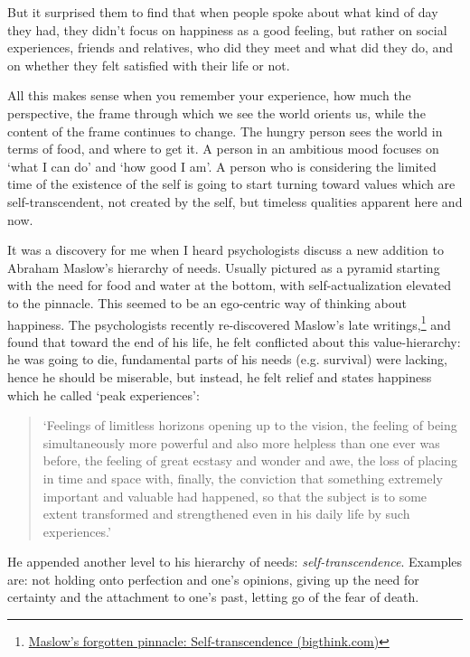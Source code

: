 
But it surprised them to find that when people spoke about what kind of
day they had, they didn't focus on happiness as a good feeling, but
rather on social experiences, friends and relatives, who did they meet
and what did they do, and on whether they felt satisfied with their life
or not.

All this makes sense when you remember your experience, how much the
perspective, the frame through which we see the world orients us, while
the content of the frame continues to change. The hungry person sees the
world in terms of food, and where to get it. A person in an ambitious
mood focuses on `what I can do' and `how good I am'. A person who is
considering the limited time of the existence of the self is going to
start turning toward values which are self-transcendent, not created by
the self, but timeless qualities apparent here and now.

It was a discovery for me when I heard psychologists discuss a new
addition to Abraham Maslow's hierarchy of needs. Usually pictured as a
pyramid starting with the need for food and water at the bottom, with
self-actualization elevated to the pinnacle. This seemed to be an
ego-centric way of thinking about happiness. The psychologists recently
re-discovered Maslow's late writings,\footnote{\href{https://bigthink.com/neuropsych/maslow-self-transcendence/}{Maslow's
  forgotten pinnacle: Self-transcendence (bigthink.com)}} and found that
toward the end of his life, he felt conflicted about this
value-hierarchy: he was going to die, fundamental parts of his needs
(e.g. survival) were lacking, hence he should be miserable, but instead,
he felt relief and states happiness which he called `peak experiences':

\begin{quote}
`Feelings of limitless horizons opening up to the vision, the feeling of
being simultaneously more powerful and also more helpless than one ever
was before, the feeling of great ecstasy and wonder and awe, the loss of
placing in time and space with, finally, the conviction that something
extremely important and valuable had happened, so that the subject is to
some extent transformed and strengthened even in his daily life by such
experiences.'
\end{quote}

He appended another level to his hierarchy of needs:
\emph{self-transcendence}. Examples are: not holding onto perfection and
one's opinions, giving up the need for certainty and the attachment to
one's past, letting go of the fear of death.

